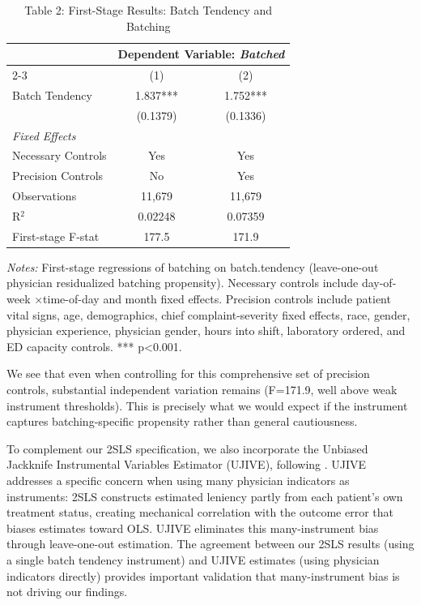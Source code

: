 \documentclass[11pt]{article}
\newcommand{\1}{\hbox{\rm 1\kern-.35em 1}}
\begin{document}
\begin{table}[t!]
\centering
\caption*{Table 2: First-Stage Results: Batch Tendency and Batching}
\begin{threeparttable}
\begin{tabular}{lcc}
\toprule 
& \multicolumn{2}{c}{Dependent Variable: \textit{Batched}}\\
\cmidrule(lr){2-3}
& (1) & (2) \\
\midrule
Batch Tendency 
    & 1.837*** & 1.752*** \\
    & (0.1379) & (0.1336) \\
\midrule
\textit{Fixed Effects} \\
Necessary Controls & Yes & Yes \\
Precision Controls & No & Yes \\
\midrule
Observations & 11{,}679 & 11{,}679 \\
R$^2$ & 0.02248 & 0.07359 \\
First-stage F-stat & 177.5 & 171.9 \\
\bottomrule
\end{tabular}
\begin{flushleft}
\footnotesize
\textit{Notes:} First-stage regressions of batching on batch.tendency (leave-one-out physician residualized batching propensity). Necessary controls include day-of-week $\times$time-of-day and month fixed effects. Precision controls include patient vital signs, age, demographics, chief complaint-severity fixed effects, race, gender, physician experience, physician gender, hours into shift, laboratory ordered, and ED capacity controls. *** p<0.001.
\end{flushleft}
\end{threeparttable}
\end{table}

We see that even when controlling for this comprehensive set of precision controls, substantial independent variation remains (F=171.9, well above weak instrument thresholds). This is precisely what we would expect if the instrument captures batching-specific propensity rather than general cautiousness.

To complement our 2SLS specification, we also incorporate the Unbiased Jackknife Instrumental Variables Estimator (UJIVE), following \cite{goldsmithpinkham2025leniencydesignsoperatorsmanual}. UJIVE addresses a specific concern when using many physician indicators as instruments: 2SLS constructs estimated leniency partly from each patient's own treatment status, creating mechanical correlation with the outcome error that biases estimates toward OLS. UJIVE eliminates this many-instrument bias through leave-one-out estimation. The agreement between our 2SLS results (using a single batch tendency instrument) and UJIVE estimates (using physician indicators directly) provides important validation that many-instrument bias is not driving our findings.
\end{document}
